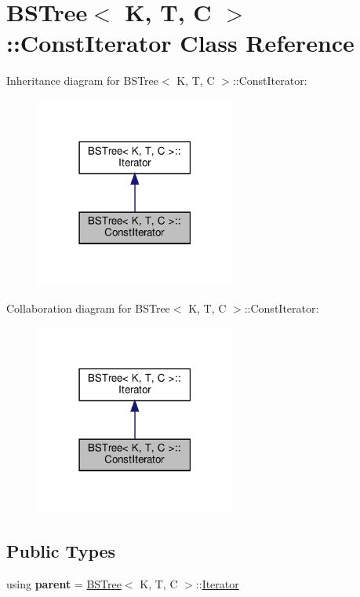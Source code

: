 \hypertarget{class_b_s_tree_1_1_const_iterator}{}\section{B\+S\+Tree$<$ K, T, C $>$\+:\+:Const\+Iterator Class Reference}
\label{class_b_s_tree_1_1_const_iterator}


Inheritance diagram for B\+S\+Tree$<$ K, T, C $>$\+:\+:Const\+Iterator\+:\nopagebreak
\begin{figure}[H]
\begin{center}
\leavevmode
\includegraphics[width=186pt]{class_b_s_tree_1_1_const_iterator__inherit__graph}
\end{center}
\end{figure}


Collaboration diagram for B\+S\+Tree$<$ K, T, C $>$\+:\+:Const\+Iterator\+:\nopagebreak
\begin{figure}[H]
\begin{center}
\leavevmode
\includegraphics[width=186pt]{class_b_s_tree_1_1_const_iterator__coll__graph}
\end{center}
\end{figure}
\subsection*{Public Types}
\begin{DoxyCompactItemize}
\item 
\mbox{\label{class_b_s_tree_1_1_const_iterator_ad1386e8c03ab2942f9b02fce12865b11}} 
using {\bfseries parent} = \hyperlink{class_b_s_tree}{B\+S\+Tree}$<$ K, T, C $>$\+::\hyperlink{class_b_s_tree_1_1_iterator}{Iterator}
\end{DoxyCompactItemize}
